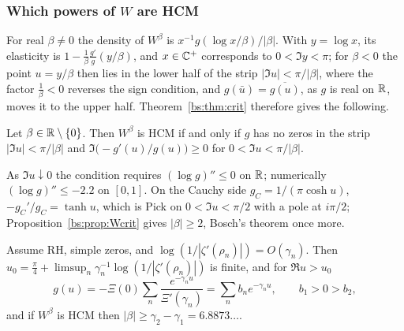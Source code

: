 \subsubsection{Which powers of $W$ are HCM}

For real $\beta\ne0$ the density of $W^\beta$ is $x^{-1}g(\log x/\beta)/|\beta|$. With $y=\log x$, its elasticity is $1-\frac1\beta\frac{g'}{g}(y/\beta)$, and $x\in\mathbb{C}^+$ corresponds to $0<\Im y<\pi$; for $\beta<0$ the point $u=y/\beta$ then lies in the lower half of the strip $|\Im u|<\pi/|\beta|$, where the factor $\frac1\beta<0$ reverses the sign condition, and $g(\bar u)=\overline{g(u)}$, as $g$ is real on $\mathbb{R}$, moves it to the upper half. Theorem~\ref{bs:thm:crit} therefore gives the following.

\begin{proposition}\label{bs:prop:Wcrit}
Let $\beta\in\mathbb{R}\setminus\{0\}$. Then $W^\beta$ is HCM if and only if $g$ has no zeros in the strip $|\Im u|<\pi/|\beta|$ and $\Im\bigl(-g'(u)/g(u)\bigr)\ge0$ for $0<\Im u<\pi/|\beta|$.
\end{proposition}

As $\Im u\downarrow0$ the condition requires $(\log g)''\le0$ on $\mathbb{R}$; numerically $(\log g)''\le-2.2$ on $[0,1]$. On the Cauchy side $g_C=1/(\pi\cosh u)$, $-g_C'/g_C=\tanh u$, which is Pick on $0<\Im u<\pi/2$ with a pole at $i\pi/2$; Proposition~\ref{bs:prop:Wcrit} gives $|\beta|\ge2$, Bosch's theorem once more.

\begin{theorem}\label{bs:thm:gap}
Assume RH, simple zeros, and $\log(1/|\zeta'(\rho_n)|)=O(\gamma_n)$. Then $u_0=\frac\pi4+\limsup_n\gamma_n^{-1}\log(1/|\zeta'(\rho_n)|)$ is finite, and for $\Re u>u_0$
\[
g(u)=-\Xi(0)\sum_n\frac{e^{-\gamma_nu}}{\Xi'(\gamma_n)}=\sum_nb_ne^{-\gamma_nu},\qquad b_1>0>b_2,
\]
and if $W^\beta$ is HCM then $|\beta|\ge\gamma_2-\gamma_1=6.8873\ldots$.
\end{theorem}

